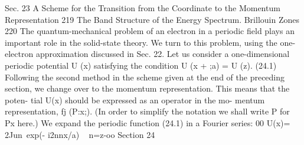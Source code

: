 \documentclass[a4paper,sfsidenotes,colorlinks=true]{tufte-book}
\numberwithin{equation}{section}
\numberwithin{figure}{section}
\begin{document}
{{{{{Sec. 23
A Scheme for the Transition from the Coordinate to the Momentum Representation
219
The Band Structure of the Energy Spectrum. Brillouin Zones
220
The quantum-mechanical problem of an electron in a periodic field plays an important role in the solid-state theory. We turn to this problem, using the one-electron approximation discussed in Sec. 22.
Let us consider a one-dimensional periodic potential U (x) satisfying the condition
U (x + ;a) = U (z).	(24.1)
Following the second method in the scheme given at the end of the preceding section, we change over to the momentum representation. This means that the poten- tial U(x) should be expressed as an operator in the mo-
mentum representation, fj (P:x;). (In order to simplify the notation we shall write P for Px here.) We expand the periodic function (24.1) in a Fourier series:
00 U(x)=	2Jun~exp(- i2nnx/a)
~	n=z-oo
Section 24
}}}}}
\end{document}
